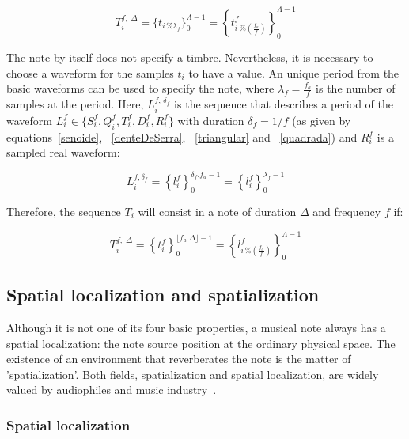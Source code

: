 \documentclass[
 aip,
 jmp,
 amsmath,amssymb,
 reprint,
]{revtex4-1}
\begin{document}
\begin{equation}\label{eq:notaBasica}
T_i^{f,\; \Delta}=\{t_{i \, \% \lambda_f} \}_0^{\Lambda-1}= \left \{t^f_{i \; \% \left( \frac{f_a}{f} \right) } \right \}_0^{\Lambda-1}
\end{equation}

The note by itself does not specify a timbre. Nevertheless, it is necessary to choose a waveform for the samples $t_i$ to have a value. An unique period from the basic waveforms can be used to specify the note, where $\lambda_f=\frac{f_a}{f}$ is the number of samples at the period. Here, $L_i^{f,\, \delta_f} $ is the sequence that describes a period of the waveform $L_i^f \in \{S_i^f,Q_i^f,T_i^f,D_i^f,R_i^f \}$ with duration $\delta_f=1/f$ (as given by equations~\ref{senoide}, ~\ref{denteDeSerra}, ~\ref{triangular} and ~\ref{quadrada}) and $R_i^f$ is a sampled real waveform:

\begin{equation}\label{periodoUnico}
L_i^{f , \delta_f } = \left\{ l_i^f \right\}_0^{\delta_f . f_a -1}=\left\{ l_i^f \right\}_0^{\lambda_f-1}
\end{equation}

Therefore, the sequence $T_i$ will consist in a note of duration $\Delta$ and frequency $f$ if:

\begin{equation}\label{eq:notaBasicaTimbre}
T_i^{f,\; \Delta}=\left\{t_i^f\right\}_0^{\lfloor f_a . \Delta \rfloor -1}=\left \{ l^f_{i\,\%\left(\frac{f_a}{f}\right)} \right \}_0^{\Lambda-1}
\end{equation}

\subsection{Spatial localization and spatialization}\label{subsec:spac}

Although it is not one of its four basic properties, a musical note always has a spatial localization: the note source position at the ordinary physical space. The existence of an environment that reverberates the note is the matter of 'spatialization'. Both fields, spatialization and spatial localization, are widely valued by audiophiles and music industry~\cite{floEsp}. 

\subsubsection{Spatial localization}
\end{document}

